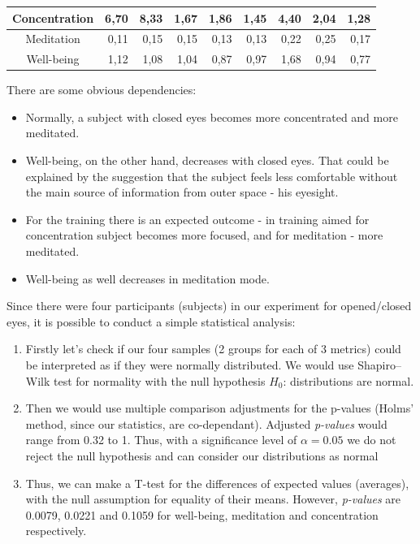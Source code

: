 \documentclass[9pt,twocolumn,twoside]{osajnl}
\begin{document}
\begin{table}[htbp]
\begin{tabular}{|ccccccccc|}
\multicolumn{1}{|c|}{Concentration} & \multicolumn{1}{r|}{6,70} & \multicolumn{1}{r|}{8,33} & \multicolumn{1}{r|}{1,67} & \multicolumn{1}{r|}{1,86} & \multicolumn{1}{r|}{1,45} & \multicolumn{1}{r|}{4,40} & \multicolumn{1}{r|}{2,04} & \multicolumn{1}{r|}{1,28} \\ \hline
\multicolumn{1}{|c|}{Meditation}    & \multicolumn{1}{r|}{0,11} & \multicolumn{1}{r|}{0,15} & \multicolumn{1}{r|}{0,15} & \multicolumn{1}{r|}{0,13} & \multicolumn{1}{r|}{0,13} & \multicolumn{1}{r|}{0,22} & \multicolumn{1}{r|}{0,25} & \multicolumn{1}{r|}{0,17} \\ \hline
\multicolumn{1}{|c|}{Well-being}    & \multicolumn{1}{r|}{1,12} & \multicolumn{1}{r|}{1,08} & \multicolumn{1}{r|}{1,04} & \multicolumn{1}{r|}{0,87} & \multicolumn{1}{r|}{0,97} & \multicolumn{1}{r|}{1,68} & \multicolumn{1}{r|}{0,94} & \multicolumn{1}{r|}{0,77} \\ \hline
\end{tabular}
\end{table}

There are some obvious dependencies:
\begin{itemize}
    \item Normally, a subject with closed eyes becomes more concentrated and more meditated.
    \item Well-being, on the other hand, decreases with closed eyes. That could be explained by the suggestion that the subject feels less comfortable without the main source of information from outer space - his eyesight.
    \item For the training there is an expected outcome - in training aimed for concentration subject becomes more focused, and for meditation - more meditated.
    \item Well-being as well decreases in meditation mode.
\end{itemize}

Since there were four participants (subjects) in our experiment for opened/closed eyes, it is possible to conduct a simple statistical analysis:
\begin{enumerate}
    \item Firstly let's check if our four samples (2 groups for each of 3 metrics) could be interpreted as if they were normally distributed. We would use Shapiro–Wilk test for normality with the null hypothesis $H_0$: distributions are normal.
    \item Then we would use  multiple comparison adjustments for the p-values (Holms' method, since our statistics, are co-dependant). Adjusted \textit{p-values} would range from 0.32 to 1. Thus, with a significance level of $\alpha=0.05$ we do not reject the null hypothesis and can consider our distributions as normal
    \item Thus, we can make a T-test for the differences of expected values (averages), with the null assumption for equality of their means. However, \textit{p-values} are 0.0079, 0.0221 and 0.1059 for well-being, meditation and concentration respectively. 
\end{enumerate}
\end{document}
